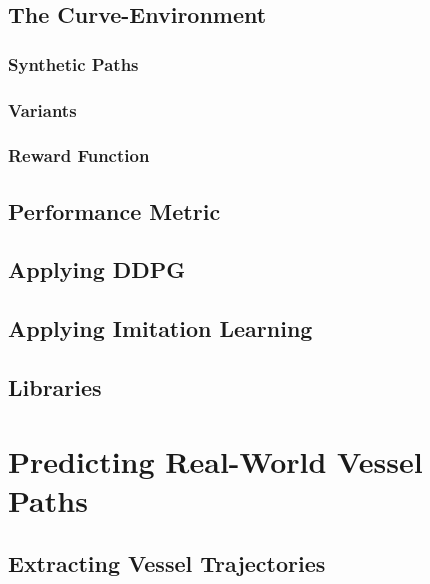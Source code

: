     \subsection{The Curve-Environment}\label{subchap:curveEnv}
        
        \subsubsection{Synthetic Paths}
        
        \subsubsection{Variants}
        
        \subsubsection{Reward Function}\label{subchap:reward}
        
        
    \subsection{Performance Metric}
    
    \subsection{Applying DDPG}
    
    \newpage
    \subsection{Applying Imitation Learning} \label{subchap:applyBC}
    
    \subsection{Libraries}
    
    
\newpage
\section{Predicting Real-World Vessel Paths}\label{chap:realworld}

    \subsection{Extracting Vessel Trajectories}
    
